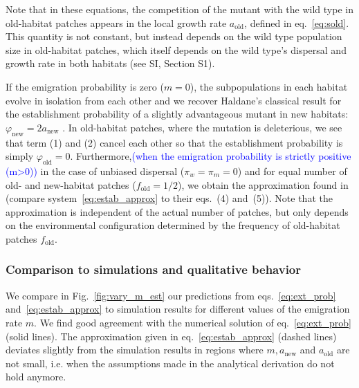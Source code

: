 \documentclass[a4paper,11pt]{article}
\newcommand{\francois}[1]{\textcolor{blue}{(#1)}}
\newcommand{\chg}[1]{\textcolor{change}{#1}}
\begin{document}
Note that in these equations, the competition of the mutant with the wild type in old-habitat patches appears in the local growth rate $a_{\text{old}}$, defined in eq.~\eqref{eq:sold}. This quantity is not constant, but instead depends on the wild type population size in old-habitat patches, which itself depends on the wild type's dispersal and growth rate in both habitats \chg{(see SI, Section S1)}.

If the emigration probability is zero ($m=0$), the subpopulations in each habitat evolve in isolation from each other and we recover Haldane's classical result for the establishment probability of a slightly advantageous mutant in new habitats: $\varphi_{\text{new}}=2a_{\text{new}}$ \citep{haldane_1927}. \chg{In old-habitat patches, where the mutation is deleterious, we see that term (1) and (2) cancel each other so that the establishment probability is simply $\varphi_{\text{old}}=0$.} Furthermore,\francois{when the emigration probability is strictly positive (m>0)} in the case of \chg{unbiased} dispersal ($\pi_w=\pi_m=0$) and for equal number of old- and new-habitat patches ($f_{\text{old}}=1/2$), we obtain the approximation found in \cite{tomasini_2018} (compare system~\eqref{eq:estab_approx} to their eqs.~(4) and~(5)). Note that the approximation is independent of the actual number of patches, but only depends on the environmental configuration determined by the frequency of old-habitat patches $f_{\text{old}}$.

\subsubsection*{Comparison to simulations and qualitative behavior}
We compare in Fig.~\ref{fig:vary_m_est} our predictions from eqs.~\eqref{eq:ext_prob} and~\eqref{eq:estab_approx} to simulation results for different values of the emigration rate $m$. We find good agreement with the numerical solution of eq.~\eqref{eq:ext_prob} (solid lines). The approximation given in eq.~\eqref{eq:estab_approx} (dashed lines) deviates slightly from the simulation results in regions where $m,a_{\text{new}}$ and $a_{\text{old}}$ are not small, i.e. when the assumptions made in the analytical derivation do not hold anymore. 
\end{document}
